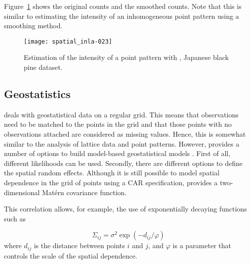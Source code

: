 \documentclass[article]{jss}
\begin{document}
\noindent
Figure~\ref{fig:sppa} shows the original counts and the smoothed counts.  Note
that this is similar to estimating the intensity of an inhomogeneous point
pattern using a smoothing method.


\begin{figure}[h]
\begin{center}
\texttt{[image: spatial\_inla-023]}
\end{center}
\caption{Estimation of the intensity of a point pattern with , 
Japanese black pine dataset.}
\label{fig:sppa}
\end{figure}



\subsection{Geostatistics}


 deals with geostatistical data on a regular grid. This means
that observations need to be matched to the points in the grid and that those
points with no observations attached are considered as missing values.
Hence, this is somewhat similar to the analysis of lattice data and point
patterns. However,  provides a number of options to build 
model-based geostatistical models \citep{DiggleRibeiro:2007}. First
of all, different likelihoods can be used. Secondly, there are different
options to define the spatial random effects. Although it is still possible
to model spatial dependence in the grid of points using a CAR specification,
 provides a two-dimensional Mat\'ern covariance function. 


This correlation allows, for example, the use of exponentially decaying
functions such as 

\begin{equation}
\Sigma_{ij} = \sigma^2 \exp(-d_{ij}/\varphi)
\end{equation}
\noindent
where $d_{ij}$ is the distance between points $i$ and $j$, and $\varphi$
is a parameter that controls the scale of the spatial dependence.


%
%
%
\end{document}
